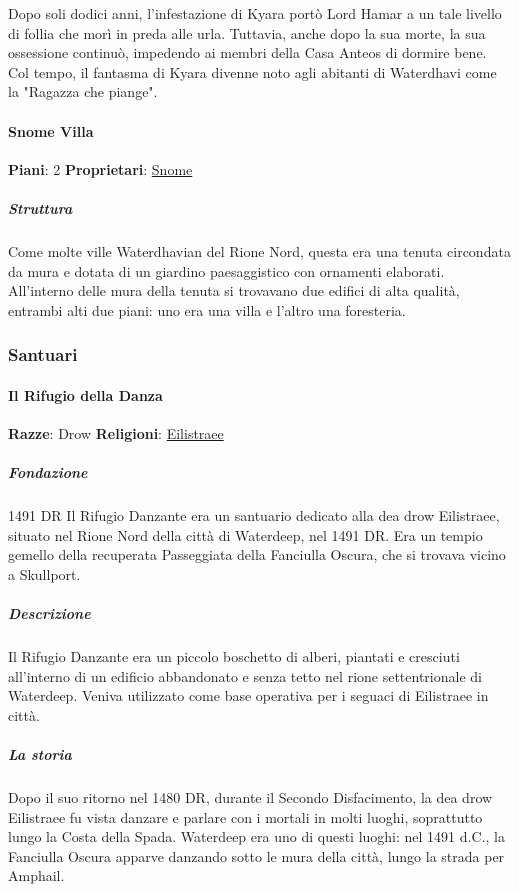 \documentclass{article}
\begin{document}
              Dopo soli dodici anni, l'infestazione di Kyara portò Lord Hamar a un tale livello di follia che morì in preda alle urla. Tuttavia, anche dopo la sua morte, la sua ossessione continuò, impedendo ai membri della Casa Anteos di dormire bene. Col tempo, il fantasma di Kyara divenne noto agli abitanti di Waterdhavi come la "Ragazza che piange".
              
              \paragraph{Snome Villa}
                  \textbf{Piani}: 2
                  \textbf{Proprietari}: \href{https://forgottenrealms.fandom.com/wiki/Snome}{Snome}
                                        \subparagraph{Struttura}
                  Come molte ville Waterdhavian del Rione Nord, questa era una tenuta circondata da mura e dotata di un giardino paesaggistico con ornamenti elaborati. All'interno delle mura della tenuta si trovavano due edifici di alta qualità, entrambi alti due piani: uno era una villa e l'altro una foresteria.

                          
        \subsubsection{Santuari}
              \paragraph{Il Rifugio della Danza}
                \textbf{Razze}: Drow\newline
                \textbf{Religioni}: \href{https://forgottenrealms.fandom.com/wiki/Eilistraee}{Eilistraee}
                                      \subparagraph{Fondazione}
                1491 DR Il Rifugio Danzante era un santuario dedicato alla dea drow Eilistraee, situato nel Rione Nord della città di Waterdeep, nel 1491 DR. Era un tempio gemello della recuperata Passeggiata della Fanciulla Oscura, che si trovava vicino a Skullport.


                                      \subparagraph{Descrizione}
                Il Rifugio Danzante era un piccolo boschetto di alberi, piantati e cresciuti all'interno di un edificio abbandonato e senza tetto nel rione settentrionale di Waterdeep. Veniva utilizzato come base operativa per i seguaci di Eilistraee in città.

                                      \subparagraph{La storia}
                Dopo il suo ritorno nel 1480 DR, durante il Secondo Disfacimento, la dea drow Eilistraee fu vista danzare e parlare con i mortali in molti luoghi, soprattutto lungo la Costa della Spada. Waterdeep era uno di questi luoghi: nel 1491 d.C., la Fanciulla Oscura apparve danzando sotto le mura della città, lungo la strada per Amphail.
\end{document}

